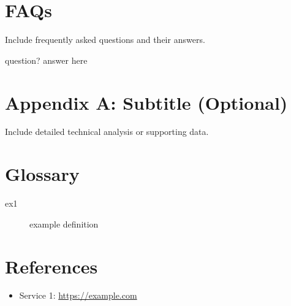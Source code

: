 \documentclass[12pt,a4paper]{article}
\begin{document}
\newpage
\section{FAQs}
Include frequently asked questions and their answers.

question?
answer here

\newpage
\appendix
\section{Appendix A: Subtitle (Optional)}
Include detailed technical analysis or supporting data.

\newpage
\section{Glossary}
\begin{description}
  \item[ex1] example definition
\end{description}

\newpage
\section{References}
\begin{itemize}
  \item Service 1: \url{https://example.com}
\end{itemize}
\end{document}

